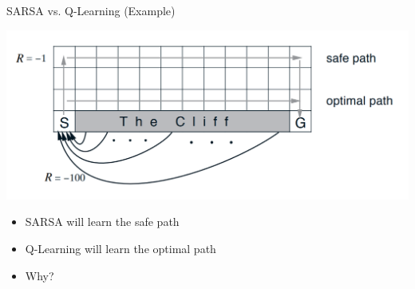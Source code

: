\documentclass[aspectratio=169]{../latex_main/tntbeamer}  %
\begin{document}
\begin{frame}[c]{SARSA vs. Q-Learning (Example)}
\begin{center}
    \includegraphics[width = .5\linewidth]{w04_model_free_control/images/cliff_walking.png}
\end{center}
\begin{itemize}
    \item SARSA will learn the safe path
    \item Q-Learning will learn the optimal path
    \item Why?
\end{itemize}
\end{frame}
\end{document}
